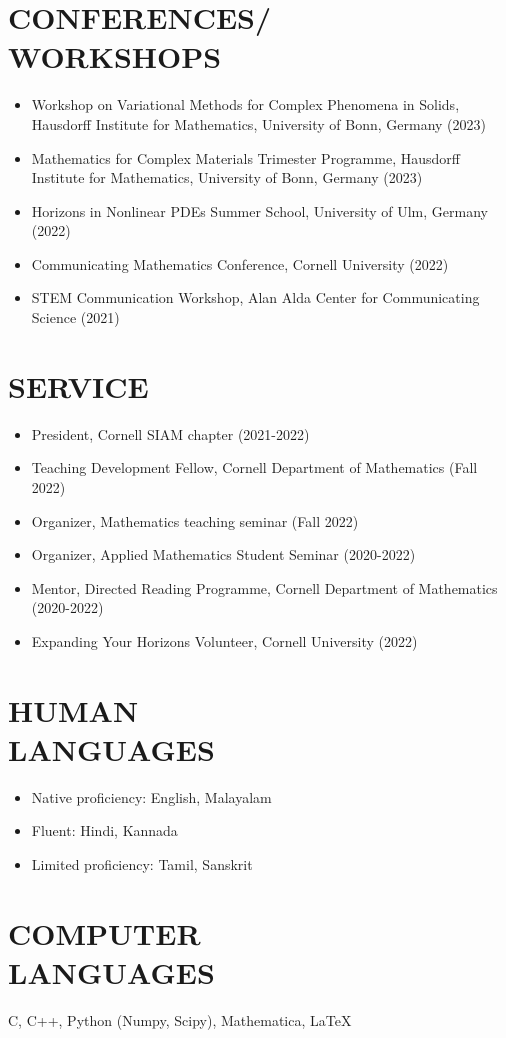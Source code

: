 \documentclass[margin]{res} %
\begin{document}
\begin{resume}
\section{CONFERENCES/\\WORKSHOPS}
\begin{itemize}
	\item Workshop on Variational Methods for Complex Phenomena in Solids, Hausdorff Institute for Mathematics, University of Bonn, Germany (2023)
	\item Mathematics for Complex Materials Trimester Programme, Hausdorff Institute for Mathematics, University of Bonn, Germany (2023)
	\item Horizons in Nonlinear PDEs Summer School, University of Ulm, Germany (2022)
	\item Communicating Mathematics Conference, Cornell University (2022)
	\item STEM Communication Workshop, Alan Alda Center for Communicating Science (2021)
\end{itemize}

\section{SERVICE}
\begin{itemize}
	\item President, Cornell SIAM chapter (2021-2022)
	\item Teaching Development Fellow, Cornell Department of Mathematics (Fall 2022)
	\item Organizer, Mathematics teaching seminar (Fall 2022)
	\item Organizer, Applied Mathematics Student Seminar (2020-2022)
	\item Mentor, Directed Reading Programme, Cornell Department of Mathematics (2020-2022)
	\item Expanding Your Horizons Volunteer, Cornell University (2022)
\end{itemize}

\section{HUMAN \\ LANGUAGES}
\begin{itemize}
	\item Native proficiency: English, Malayalam
	\item Fluent: Hindi, Kannada
	\item Limited proficiency: Tamil, Sanskrit
\end{itemize}

\section{COMPUTER \\ LANGUAGES}
C, C++, Python (Numpy, Scipy), Mathematica, \LaTeX

\end{resume}
\end{document}
